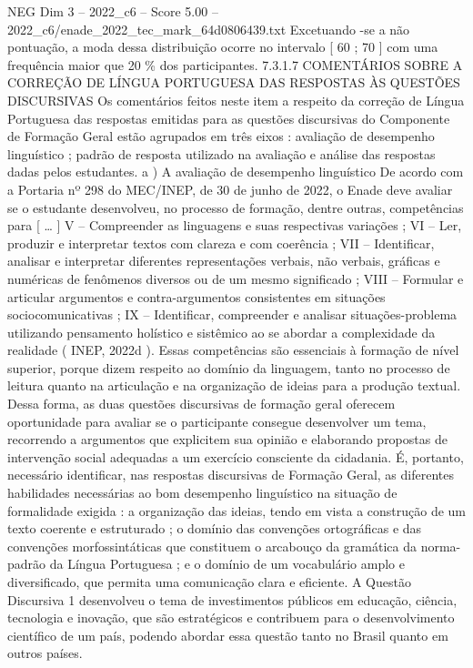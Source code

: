 \begin{textsample}{NEG Dim 3 – 2022\_c6 – Score 5.00 – 2022\_c6/enade\_2022\_tec\_mark\_64d0806439.txt}
Excetuando -se a não pontuação, a moda dessa distribuição ocorre no intervalo [ 60 ; 70 ] com uma frequência maior que 20 \% dos participantes. 7.3.1.7 COMENTÁRIOS SOBRE A CORREÇÃO DE LÍNGUA PORTUGUESA DAS RESPOSTAS ÀS QUESTÕES DISCURSIVAS Os comentários feitos neste item a respeito da correção de Língua Portuguesa das respostas emitidas para as questões discursivas do Componente de Formação Geral estão agrupados em três eixos : avaliação de desempenho linguístico ; padrão de resposta utilizado na avaliação e análise das respostas dadas pelos estudantes. a ) A avaliação de desempenho linguístico De acordo com a Portaria nº 298 do MEC/INEP, de 30 de junho de 2022, o Enade deve avaliar se o estudante desenvolveu, no processo de formação, dentre outras, competências para [ … ] V – Compreender as linguagens e suas respectivas variações ; VI – Ler, produzir e interpretar textos com clareza e com coerência ; VII – Identificar, analisar e interpretar diferentes representações verbais, não verbais, gráficas e numéricas de fenômenos diversos ou de um mesmo significado ; VIII – Formular e articular argumentos e contra-argumentos consistentes em situações sociocomunicativas ; IX – Identificar, compreender e analisar situações-problema utilizando pensamento holístico e sistêmico ao se abordar a complexidade da realidade ( INEP, 2022d ).
Essas competências são essenciais à formação de nível superior, porque dizem respeito ao domínio da linguagem, tanto no processo de leitura quanto na articulação e na organização de ideias para a produção textual.
Dessa forma, as duas questões discursivas de formação geral oferecem oportunidade para avaliar se o participante consegue desenvolver um tema, recorrendo a argumentos que explicitem sua opinião e elaborando propostas de intervenção social adequadas a um exercício consciente da cidadania.
É, portanto, necessário identificar, nas respostas discursivas de Formação Geral, as diferentes habilidades necessárias ao bom desempenho linguístico na situação de formalidade exigida : a organização das ideias, tendo em vista a construção de um texto coerente e estruturado ; o domínio das convenções ortográficas e das convenções morfossintáticas que constituem o arcabouço da gramática da norma-padrão da Língua Portuguesa ; e o domínio de um vocabulário amplo e diversificado, que permita uma comunicação clara e eficiente.
A Questão Discursiva 1 desenvolveu o tema de investimentos públicos em educação, ciência, tecnologia e inovação, que são estratégicos e contribuem para o desenvolvimento científico de um país, podendo abordar essa questão tanto no Brasil quanto em outros países.

\end{textsample}
